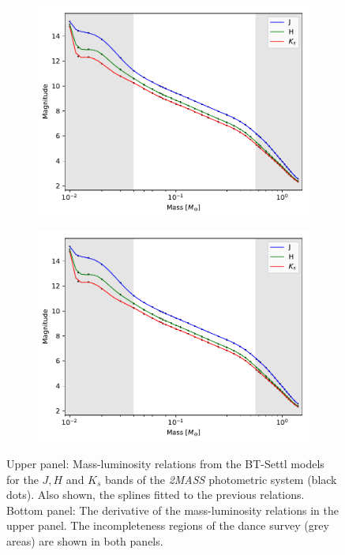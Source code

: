 \begin{figure}[ht!]
    \centering
    \begin{subfigure}[t]{0.7\textwidth}
    \centering
       \includegraphics[page=1,width=\textwidth]{background/Figures/FitSpline_AllardModels.pdf}
        \caption{}
        \label{fig:splineML}
    \end{subfigure}
    \begin{subfigure}[t]{0.7\textwidth}
    \centering
     \includegraphics[page=2,width=\textwidth]{background/Figures/FitSpline_AllardModels.pdf}
        \caption{}
        \label{fig:der_splineML}
    \end{subfigure}
\caption{Upper panel: Mass-luminosity relations from the BT-Settl models \citep{Allard2012} for the $J, H$ and $K_s$ bands of the \emph{2MASS} photometric system (black dots). Also shown, the splines fitted to the previous relations. Bottom panel: The derivative of the mass-luminosity relations in the upper panel. The incompleteness regions of the \gls{dance} survey (grey areas) are shown in both panels.}
\label{fig:ML}
\end{figure}

